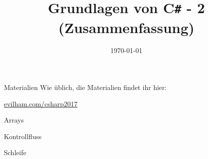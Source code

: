 



\title{Grundlagen von C\texttt{\#} - 2 (Zusammenfassung)}
\date{\today}


\usepackage{subfig}


\maketitle

\begin{frame}{Materialien}
	\centering Wie üblich, die Materialien findet ihr hier:
	
	\huge \href{https://evilham.com/csharp2017}{evilham.com/csharp2017}
\end{frame}

\begin{frame}{Arrays}
    
\end{frame}

\begin{frame}{Kontrollfluss}
    
\end{frame}

\begin{frame}{Schleife}
    
\end{frame}

